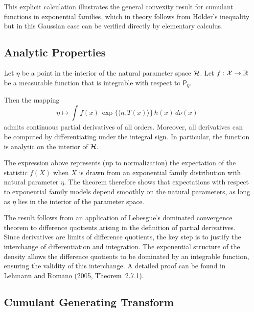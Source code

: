 \begin{ex}
This explicit calculation illustrates the general convexity result for cumulant
functions in exponential families, which in theory follows from Hölder’s
inequality but in this Gaussian case can be verified directly by elementary
calculus.
\end{ex}

\subsection{Analytic Properties}
\label{sub:ap}

\begin{theo}
\label{theo:ap}
Let \(\eta\) be a point in the interior of the natural parameter space \(\mathcal{H}\).
Let \(f : \mathcal{X} \to \mathbb{R}\) be a measurable function that is integrable with respect
to \(\mathsf{P}_{\eta}\).

Then the mapping
\[
\eta \longmapsto
\int_{}^{} f(x)\,
\exp\!\bigl\{\langle \eta, T(x) \rangle\bigr\}
\, h(x)\, d\nu(x)
\]
admits continuous partial derivatives of all orders. Moreover, all derivatives
can be computed by differentiating under the integral sign. In particular, the
function is analytic on the interior of \(\mathcal{H}\).
\end{theo}

\begin{remark}
The expression above represents (up to normalization) the expectation of the
statistic \(f(X)\) when \(X\) is drawn from an exponential family distribution
with natural parameter \(\eta\). The theorem therefore shows that expectations
with respect to exponential family models depend smoothly on the natural
parameters, as long as \(\eta\) lies in the interior of the parameter space.
\end{remark}

\begin{remark}
The result follows from an application of Lebesgue’s dominated convergence
theorem to difference quotients arising in the definition of partial
derivatives. Since derivatives are limits of difference quotients, the key step
is to justify the interchange of differentiation and integration. The
exponential structure of the density allows the difference quotients to be
dominated by an integrable function, ensuring the validity of this
interchange. A detailed proof can be found in Lehmann and Romano (2005,
Theorem~2.7.1).
\end{remark}

\subsection{Cumulant Generating Transform}
\label{sub:cgt}

